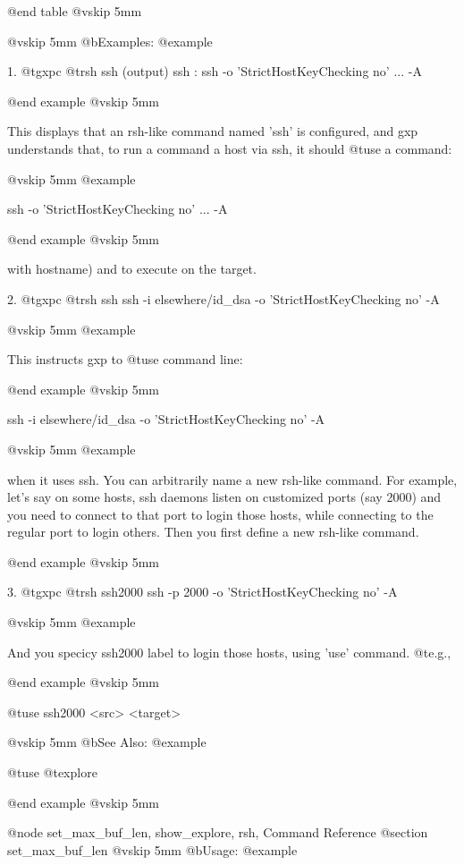@end table
@vskip 5mm

@vskip 5mm
@b{Examples:}
@example

1.
  @t{gxpc} @t{rsh} ssh
  (output) ssh : ssh -o 'StrictHostKeyChecking no' ... -A %

@end example
@vskip 5mm

  This displays that an rsh-like command named 'ssh' is configured,
  and gxp understands that, to run a command a host via ssh, it should
  @t{use} a command:

@vskip 5mm
@example

         ssh -o 'StrictHostKeyChecking no' ... -A %

@end example
@vskip 5mm

  with %
  hostname) and %
  to execute on the target.
  
2.   
  @t{gxpc} @t{rsh} ssh ssh -i elsewhere/id_dsa -o 'StrictHostKeyChecking no' -A %

@vskip 5mm
@example

  This instructs gxp to @t{use} command line:

@end example
@vskip 5mm

     ssh -i elsewhere/id_dsa -o 'StrictHostKeyChecking no' -A %

@vskip 5mm
@example

  when it uses ssh.  You can arbitrarily name a new rsh-like command. 
  For example, let's say on some hosts, ssh daemons listen on customized 
  ports (say 2000) and you need to connect to that port to login those 
  hosts, while connecting to the regular port to login others. Then you 
  first define a new rsh-like command.

@end example
@vskip 5mm
  
3.
  @t{gxpc} @t{rsh} ssh2000 ssh -p 2000 -o 'StrictHostKeyChecking no' -A %

@vskip 5mm
@example

  And you specicy ssh2000 label to login those hosts, using 'use' command. @t{e}.g.,

@end example
@vskip 5mm

     @t{use} ssh2000 <src> <target>

@vskip 5mm
@b{See Also:}
@example

  @t{use} @t{explore}

@end example
@vskip 5mm


@node set_max_buf_len, show_explore, rsh, Command Reference
@section set_max_buf_len
@vskip 5mm
@b{Usage:}
@example

